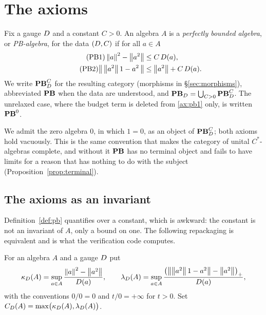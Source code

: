 \section{The axioms}
\label{sec:axioms}

\begin{definition}[PB-algebras]\label{def:pb}
Fix a gauge $D$ and a constant $C>0$.  An algebra $A$ is a
\emph{perfectly bounded algebra}, or \emph{PB-algebra}, for the data
$(D,C)$ if for all $a\in A$
\begin{align}
  \tag{PB1}\label{ax:pb1}
  \left\lVert a\right\rVert^2-\left\lVert a^2\right\rVert&\le C\,D(a), \\
  \tag{PB2}\label{ax:pb2}
  \bigl\lVert\,\left\lVert a^2\right\rVert1-a^2\,\bigr\rVert&\le\left\lVert a^2\right\rVert+C\,D(a) .
\end{align}
We write $\mathbf{PB}^C_D$ for the resulting category (morphisms in
\S\ref{sec:morphisms}), abbreviated $\mathbf{PB}$ when the data are understood, and
$\mathbf{PB}_D=\bigcup_{C>0}\mathbf{PB}^C_D$.  The unrelaxed case, where the budget
term is deleted from \eqref{ax:pb1} only, is written $\mathbf{PB}^0$.
\end{definition}

\begin{convention}\label{conv:degenerate}
We admit the zero algebra $0$, in which $1=0$, as an object of $\mathbf{PB}^C_D$;
both axioms hold vacuously.  This is the same convention that makes the
category of unital $C^*$-algebras complete, and without it $\mathbf{PB}$ has no
terminal object and fails to have limits for a reason that has nothing to do
with the subject (Proposition~\ref{prop:terminal}).
\end{convention}

\subsection{The axioms as an invariant}

Definition~\ref{def:pb} quantifies over a constant, which is awkward: the
constant is not an invariant of $A$, only a bound on one.  The following
repackaging is equivalent and is what the verification code computes.

\begin{definition}\label{def:critical}
For an algebra $A$ and a gauge $D$ put
\[
  \kappa_D(A)=\sup_{a\in A}\frac{\left\lVert a\right\rVert^2-\left\lVert a^2\right\rVert}{D(a)},
  \qquad
  \lambda_D(A)=\sup_{a\in A}\frac{\bigl(\bigl\lVert\left\lVert a^2\right\rVert1-a^2\bigr\rVert-\left\lVert a^2\right\rVert\bigr)_+}{D(a)},
\]
with the conventions $0/0=0$ and $t/0=+\infty$ for $t>0$.  Set
$C_D(A)=\max\bigl(\kappa_D(A),\lambda_D(A)\bigr)$.
\end{definition}


